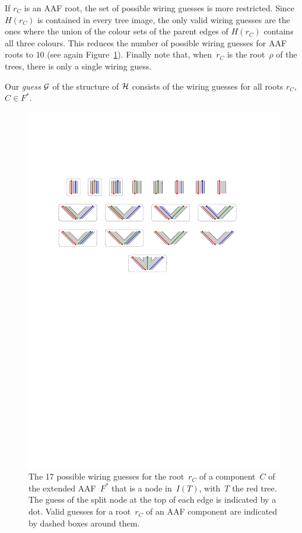 If $r_C$ is an AAF root, the set of possible wiring guesses is more restricted.
Since $H(r_C)$ is contained in every tree image, the only valid wiring guesses
are the ones where the union of the colour sets of the parent edges of $H(r_C)$
contains all three colours. This reduces the number of possible wiring guesses for AAF roots to $10$ {(see again Figure~\ref{fig:guesses})}. {Finally note that, when~$r_C$ is the root~$\rho$ of the trees, there is only a single wiring guess.}

Our \emph{guess} $\mathcal{G}$ of the structure of $\mathcal{H}$ consists of the wiring guesses for all roots $r_C$, $C \in F^*$.

\begin{figure}
  \centering
  \includegraphics{../figs/ch4/guesses}
  \caption{The 17 possible wiring guesses for {the root~$r_C$ of a component~$C$ of the extended AAF~$F^*$ that is a node in~$I(T)$, with~$T$ the red tree}.
    The guess of the split node at the top of each edge is indicated by a dot.
    Valid guesses for a root~$r_C$ of an AAF component are indicated by dashed boxes around them.}
  \label{fig:guesses}
\end{figure}


